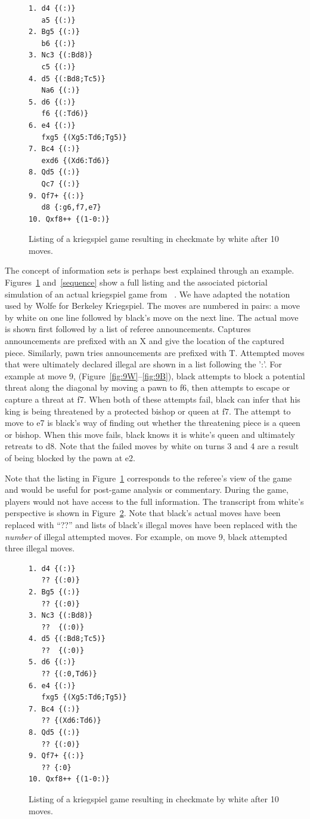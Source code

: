 \documentclass[11pt]{article}
\begin{document}
\begin{figure}
\begin{verbatim}
1. d4 {(:)}
   a5 {(:)}
2. Bg5 {(:)}
   b6 {(:)}
3. Nc3 {(:Bd8)}
   c5 {(:)}
4. d5 {(:Bd8;Tc5)}
   Na6 {(:)}
5. d6 {(:)}
   f6 {(:Td6)}
6. e4 {(:)}
   fxg5 {(Xg5:Td6;Tg5)}
7. Bc4 {(:)}
   exd6 {(Xd6:Td6)}
8. Qd5 {(:)}
   Qc7 {(:)}
9. Qf7+ {(:)} 
   d8 {:g6,f7,e7}
10. Qxf8++ {(1-0:)}
\end{verbatim}
\caption{Listing of a kriegspiel game resulting in checkmate by white after 10 moves.}
\label{listing}
\end{figure}

The concept of information sets is perhaps best explained through an example.  Figures~\ref{listing} and~\ref{sequence}
show a full listing and the associated pictorial simulation of an actual kriegspiel game from ~\cite{li94chess}.  We
have adapted the notation used by Wolfe for Berkeley Kriegspiel.  The moves are numbered in pairs: a move by white on
one line followed by black's move on the next line.  The actual move is shown first followed by a list of referee
announcements.  Captures announcements are prefixed with an X and give the location of the captured piece.  Similarly,
pawn tries announcements are prefixed with T.  Attempted moves that were ultimately declared illegal are shown in a list
following the ':'.  For example at move 9, (Figure~\ref{fig:9W}--\ref{fig:9B}), black attempts to block a potential
threat along the diagonal by moving a pawn to f6, then attempts to escape or capture a threat at f7.  When both of these
attempts fail, black can infer that his king is being threatened by a protected bishop or queen at f7.  The attempt to
move to e7 is black's way of finding out whether the threatening piece is a queen or bishop.  When this move fails,
black knows it is white's queen and ultimately retreats to d8.  Note that the failed moves by white on turns 3 and 4 are
a result of being blocked by the pawn at e2.


Note that the listing in Figure~\ref{listing} corresponds to the referee's view of the game and would be useful for
post-game analysis or commentary.  During the game, players would not have access to the full information.  The
transcript from white's perspective is shown in Figure~\ref{filteredlisting}.  Note that black's actual moves have been
replaced with ``??'' and lists of black's illegal moves have been replaced with the {\em number} of illegal attempted
moves.  For example, on move 9, black attempted three illegal moves.
\begin{figure}
\begin{verbatim}
1. d4 {(:)}
   ?? {(:0)}
2. Bg5 {(:)}
   ?? {(:0)}
3. Nc3 {(:Bd8)}
   ??  {(:0)}
4. d5 {(:Bd8;Tc5)}
   ??  {(:0)}
5. d6 {(:)}
   ?? {(:0,Td6)}
6. e4 {(:)}
   fxg5 {(Xg5:Td6;Tg5)}
7. Bc4 {(:)}
   ?? {(Xd6:Td6)}
8. Qd5 {(:)}
   ?? {(:0)}
9. Qf7+ {(:)} 
   ?? {:0}
10. Qxf8++ {(1-0:)}
\end{verbatim}
\caption{Listing of a kriegspiel game resulting in checkmate by white after 10 moves.}
\label{filteredlisting}
\end{figure}
\end{document}
